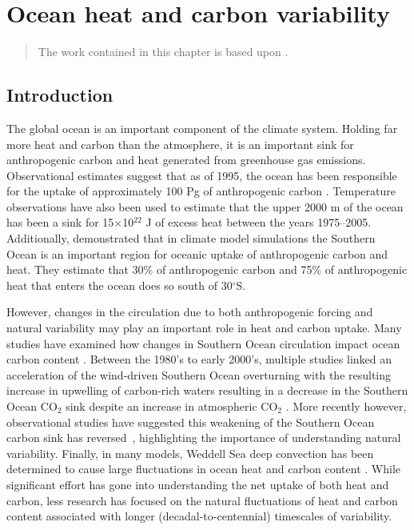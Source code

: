 \graphicspath{{figures/chapter-ocean-heat-carbon/}} %

\chapter{Ocean heat and carbon variability}
\label{cha:ocean_heat_carbon}

\begin{quotation}
  The work contained in this chapter is based upon \citet{Thomas2017}.
\end{quotation}

\section{Introduction}
The global ocean is an important component of the climate system. Holding far more
heat and carbon than the atmosphere, it is an
important sink for anthropogenic carbon and heat generated from greenhouse gas
emissions. Observational estimates suggest that as of 1995, the ocean has been
responsible for the uptake of approximately 100 Pg of anthropogenic carbon
\citep{Khatiwala2012,Sabine2004,Waugh2006}. Temperature observations have also
been used to estimate that the upper 2000 m of the ocean has been a sink for
15$\times$10$^{\mathrm{22}}$ J of excess heat \citep{Levitus2009} between the
years 1975--2005. Additionally, \citet{Frolicher2015} demonstrated that in
climate model simulations the Southern Ocean is an important region for oceanic
uptake of anthropogenic carbon and heat. They estimate that 30\% of
anthropogenic carbon and 75\% of anthropogenic heat that enters the ocean does
so south of 30$^{\circ}$S.

However, changes in the circulation due to both anthropogenic forcing and
natural variability may play an important role in heat and carbon uptake. Many
studies have examined how changes in Southern Ocean circulation impact ocean
carbon content \citep{Sarmiento1984,Sarmiento1996,Marinov2008}. Between the
1980's to early 2000's, multiple studies linked an acceleration of the
wind-driven Southern Ocean overturning with the resulting increase in upwelling
of carbon-rich waters resulting in a decrease in the Southern Ocean
CO$_{\mathrm{2}}$ sink despite an increase in atmospheric CO$_2$
\citep{LeQuere2000h,Lovenduski2007,Lenton2009}. More recently however,
observational studies have suggested this weakening of the Southern Ocean carbon
sink has reversed~\citep{Landsch2015,Devries2017}, highlighting the importance
of understanding natural variability.
Finally, in many models, Weddell Sea deep convection has been
determined to cause large fluctuations in ocean heat \citep{Latif2013,
DeLavergne2014a} and carbon content \citep{Bernardello2014}. While significant
effort has gone into understanding the net uptake of both heat and carbon, less
research has focused on the natural fluctuations of heat and carbon content
associated with longer (decadal-to-centennial) timescales of variability.

